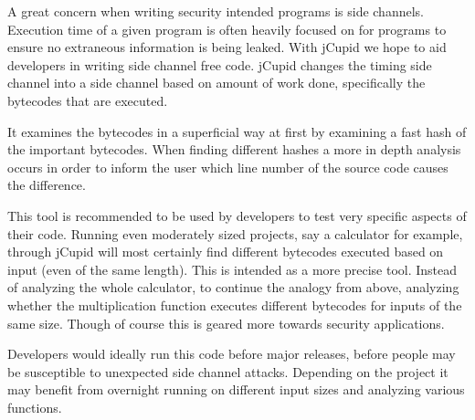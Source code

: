 A great concern when writing security intended programs is side channels. Execution time of a given program is often heavily focused on for programs to ensure no extraneous information is being leaked. With jCupid we hope to aid developers in writing side channel free code. jCupid changes the timing side channel into a side channel based on amount of work done, specifically the bytecodes that are executed. 

It examines the bytecodes in a superficial way at first by examining a fast hash of the important bytecodes. When finding different hashes a more in depth analysis occurs in order to inform the user which line number of the source code causes the difference. 

This tool is recommended to be used by developers to test very specific aspects of their code. Running even moderately sized projects, say a calculator for example, through jCupid will most certainly find different bytecodes executed based on input (even of the same length). This is intended as a more precise tool. Instead of analyzing the whole calculator, to continue the analogy from above, analyzing whether the multiplication function executes different bytecodes for inputs of the same size. Though of course this is geared more towards security applications.

Developers would ideally run this code before major releases, before people may be susceptible to unexpected side channel attacks. Depending on the project it may benefit from overnight running on different input sizes and analyzing various functions.

